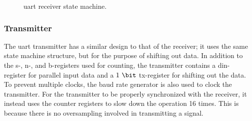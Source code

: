 \documentclass[main.tex]{subfiles}
\begin{document}
\begin{figure}
\begin{center}
\caption{\gls{uart} receiver state machine.}
\label{fig:uartrx}
\end{center}
\end{figure}

\subsubsection{Transmitter}
The \gls{uart} transmitter has a similar design to that of the receiver; it uses the same state machine structure, but for the purpose of shifting out data. In addition to the s-, n-, and b-registers used for counting, the transmitter contains a din-register for parallel input data and a $1~\bit$ tx-register for shifting out the data. To prevent multiple clocks, the baud rate generator is also used to clock the transmitter. For the transmitter to be properly synchronized with the receiver, it instead uses the counter registers to slow down the operation 16 times. This is because there is no oversampling involved in transmitting a signal.\\
\end{document}
